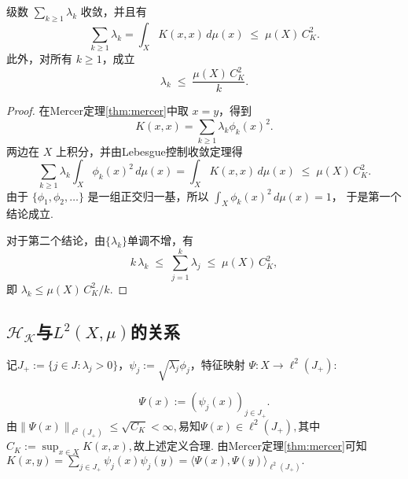 \documentclass[../master.tex]{subfiles}
\begin{document}
\begin{corollary}
级数 $\sum_{k\geq 1}\lambda_k$ 收敛，并且有
\[
\sum_{k\geq 1}\lambda_k
= \int_X K(x,x)\,d\mu(x)
\;\leq\; \mu(X)\,C_K^2.
\]
此外，对所有 $k\geq 1$，成立
\[
\lambda_k \;\leq\; \frac{\mu(X)\,C_K^2}{k}.
\]
\end{corollary}

\begin{proof}
在Mercer定理\ref{thm:mercer}中取 $x=y$，得到
\[
K(x,x)=\sum_{k\geq 1}\lambda_k \phi_k(x)^2.
\]
两边在 $X$ 上积分，并由Lebesgue控制收敛定理得
\[
\sum_{k\geq 1}\lambda_k\int_X \phi_k(x)^2\,d\mu(x)
=\int_X K(x,x)\,d\mu(x)
\;\leq\;\mu(X)\,C_K^2.
\]
由于 $\{\phi_1,\phi_2,\dots\}$ 是一组正交归一基，所以
\(\int_X \phi_k(x)^2\,d\mu(x)=1\)，
于是第一个结论成立.

对于第二个结论，由$\{\lambda_k\}$单调不增，有
\[
k\,\lambda_k \;\leq\;\sum_{j=1}^k \lambda_j
\;\leq\;\mu(X)\,C_K^2,
\]
即
\(\lambda_k \leq \mu(X)\,C_K^2/k\).
\end{proof}



\subsection{$\mathcal{H_K}$与$L^2(X,\mu)$的关系}
记$J_+:=\{j\in J:\lambda_j>0\}$，$\psi_j:=\sqrt{\lambda_j}\phi_j$，特征映射
$\Psi:X\to \ell^2(J_+):$

$$\Psi(x) := (\psi_j(x))_{j\in J_+}.$$
由$\|\Psi(x)\|_{\ell^2(J_+)}\leq \sqrt{C_K}<\infty,$易知$\Psi(x)\in \ell^2(J_+),$其中$C_K:=\sup_{x\in X}K(x,x),$故上述定义合理. 由Mercer定理\ref{thm:mercer}可知$K(x,y)=\sum_{j\in J_+}\psi_j(x)\psi_j(y) = \langle \Psi(x),\Psi(y)\rangle_{\ell^2(J_+)}.$
\end{document}
